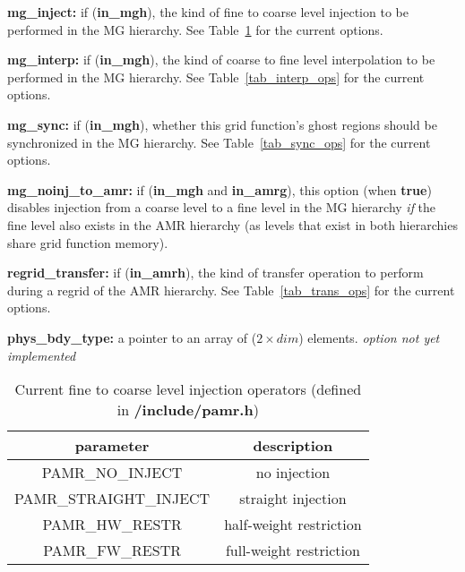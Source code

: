 \documentclass[aps,amssymb,unsortedaddress,nofootinbib]{revtex4}
\def\lsep{\itemsep 0.05in}
\begin{document}
\begin{list}{}{\lsep}
\item {\bf mg\_inject:} if ({\bf in\_mgh}), the kind of fine to coarse level injection to be performed in the MG
          hierarchy. See Table~\ref{tab_inj_ops} for the current options. 

\item {\bf mg\_interp:} if ({\bf in\_mgh}), the kind of coarse to fine level interpolation to be performed
          in the MG hierarchy.
          See Table~\ref{tab_interp_ops} for the current options. 

\item {\bf mg\_sync:} if ({\bf in\_mgh}), whether this grid function's ghost regions should be 
          synchronized in the MG hierarchy.
          See Table~\ref{tab_sync_ops} for the current options. 

\item {\bf mg\_noinj\_to\_amr:} if ({\bf in\_mgh} and {\bf in\_amrg}), this option (when {\bf true})
          disables injection from a coarse level to a fine level in the MG hierarchy {\em if} the fine
          level also exists in the AMR hierarchy (as levels that exist in both hierarchies
          share grid function memory). 

\item {\bf regrid\_transfer:} if ({\bf in\_amrh}), the kind of transfer operation to perform during
          a regrid of the AMR hierarchy.
          See Table~\ref{tab_trans_ops} for the current options. 

\item {\bf phys\_bdy\_type:} a pointer to an array of ($2\times dim$) elements. {\em option not yet implemented}

\end{list}

\begin{table}
\begin{center}
\begin{tabular}[t]{| c || c |}
\hline
parameter & description \\
\hline
\hline
PAMR\_NO\_INJECT       & no injection \\
PAMR\_STRAIGHT\_INJECT & straight injection\\
PAMR\_HW\_RESTR        & half-weight restriction\\
PAMR\_FW\_RESTR        & full-weight restriction\\
\hline
\end{tabular}
\end{center}
\caption
{ Current fine to coarse level injection operators (defined in {\bf /include/pamr.h})
\label{tab_inj_ops}}
\end{table}
\end{document}
